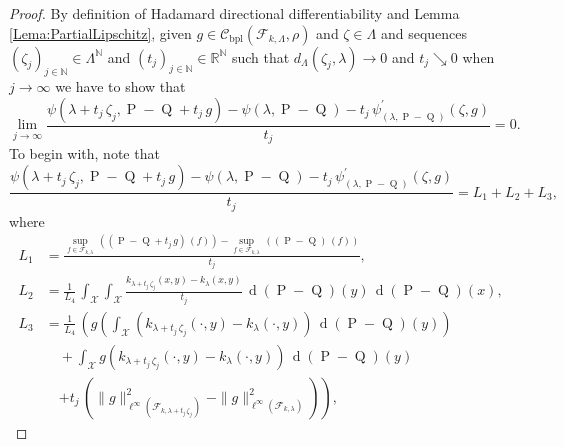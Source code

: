 		\begin{proof}
			By definition of Hadamard directional differentiability and Lemma \ref{Lema:PartialLipschitz}, given $g\in\mathcal{C}_{\operatorname{bpl}}\left(\mathcal{F}_{k,\Lambda},\rho\right)$ and $\zeta\in\Lambda$ and sequences $\left(\zeta_{j}\right)_{j\in\mathbb{N}}\in\Lambda^{\mathbb{N}}$ and $\left(t_{j}\right)_{j\in\mathbb{N}}\in\mathbb{R}^{\mathbb{N}}$ such that $d_{\Lambda}\left(\zeta_{j},\lambda\right)\longrightarrow0$ and $t_{j}\searrow0$ when $j\longrightarrow\infty$ we have to show that
			\begin{equation}
				\lim_{j\longrightarrow\infty}\frac{\psi\left(\lambda+t_{j}\,\zeta_{j},\operatorname{P}-\operatorname{Q}+t_{j}\,g\right)-\psi(\lambda,\operatorname{P}-\operatorname{Q})-t_{j}\,\psi_{(\lambda,\operatorname{P}-\operatorname{Q})}^{\prime}\left(\zeta,g\right)}{t_{j}}=0.
			\end{equation}
			To begin with, note that
			\begin{equation}
				\frac{\psi\left(\lambda+t_{j}\,\zeta_{j},\operatorname{P}-\operatorname{Q}+t_{j}\,g\right)-\psi(\lambda,\operatorname{P}-\operatorname{Q})-t_{j}\,\psi_{(\lambda,\operatorname{P}-\operatorname{Q})}^{\prime}\left(\zeta,g\right)}{t_{j}}=L_{1}+L_{2}+L_{3},
			\end{equation}
			where
			\begin{equation}
				\begin{aligned}
					L_{1}&=\frac{\underset{f\in\mathcal{F}_{k,\lambda}}{\operatorname{sup}}\,\left(\left(\operatorname{P}-\operatorname{Q}+t_{j}\,g\right)\,(f)\right)-\underset{f\in\mathcal{F}_{k,\lambda}}{\operatorname{sup}}\,\left(\left(\operatorname{P}-\operatorname{Q}\right)\,(f)\right)}{t_{j}},
					\\
					L_{2}&=\frac{1}{L_{4}}\,\int_{\mathcal{X}}\int_{\mathcal{X}}\frac{k_{\lambda+t_{j}\,\zeta_{j}}(x,y)-k_{\lambda}(x,y)}{t_{j}}\,\operatorname{d}(\operatorname{P}-\operatorname{Q})(y)\,\operatorname{d}(\operatorname{P}-\operatorname{Q})(x),
					\\
					L_{3}&=\frac{1}{L_{4}}\,\left(g\left(\int_{\mathcal{X}}\left(k_{\lambda+t_{j}\,\zeta_{j}}(\cdot,y)-k_{\lambda}(\cdot,y)\right)\,\operatorname{d}(\operatorname{P}-\operatorname{Q})(y)\right)\right.
					\\
					&\quad+\int_{\mathcal{X}}g\left(k_{\lambda+t_{j}\,\zeta_{j}}(\cdot,y)-k_{\lambda}(\cdot,y)\right)\,\operatorname{d}(\operatorname{P}-\operatorname{Q})(y)
					\\
					&\quad\left.+t_{j}\,\left(\|g\|_{\ell^{\infty}\left(\mathcal{F}_{k,\lambda+t_{j}\,\zeta_{j}}\right)}^{2}-\|g\|_{\ell^{\infty}\left(\mathcal{F}_{k,\lambda}\right)}^{2}\right)\right),

\end{aligned}
\end{equation}
\end{proof}
